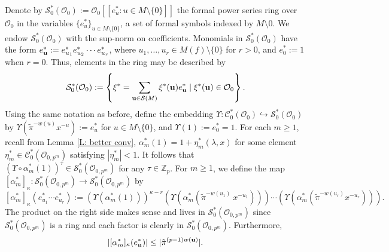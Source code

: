 \documentclass{article}
\theoremstyle{remark}
\def\bb #1{ {\mathbb #1} }
\def\c #1{ {\mathcal #1} }
\def\b #1{ {\bf #1} }
\begin{document}
\bigskip{} Denote by $\c S^*_0(\c O_0) := \c O_0[[ e_u^* : u \in M \setminus \{0\}]]$ the formal power series ring over $\c O_0$ in the variables $\{ e_u^* \}_{u \in M \setminus \{0\} }$, a set of formal symbols indexed by $M \setminus 0$. We endow $\c S_0^*( \c O_0)$ with the sup-norm on coefficients. Monomials in $\c S_0^*(\c O_0)$ have the form $e_{\b u}^* := e_{u_1}^* e_{u_2}^* \cdots e_{u_r}^*$, where $u_1, \ldots, u_r \in M(f) \setminus \{0\}$ for $r > 0$, and $e_0^* := 1$ when $r = 0$. Thus, elements in the ring may be described by
\[
\c S^*_0(\c O_0) := \left\{ \xi^* = \sum_{\b u \in \c S(M)} \xi^*(\b u) e_{\b u}^* \mid \xi^*(\b u) \in \c O_0  \right\}.
\]
Using the same notation as before, define the embedding $\Upsilon: \c C_0^*(\c O_0) \hookrightarrow \c S_0^*(\c O_0)$ by $\Upsilon(\tilde \pi^{-w(u)} x^{-u}) := e_u^*$ for $u \in M \setminus \{ 0\}$, and $\Upsilon(1) := e_0^* = 1$. For each $m \geq 1$, recall from Lemma \ref{L: better conv},  $\alpha_m^*(1)= 1 + \eta_m^*(\lambda, x)$ for some element $\eta_m^* \in \c C_0^*({\c O}_{0, p^m})$ satisfying $|\eta^*_m| < 1$. It follows that $\left(\Upsilon \circ \alpha_m^* (1) \right)^{\tau} \in \c S_0^*({\c O}_{0, p^m})$ for any $\tau \in \bb Z_p$. For $m \geq 1$,  we define the map $[\alpha_m^*]_\kappa: \c S_0^*(\c O_{0, p^m}) \rightarrow \c S_0^*({\c O}_{0, p^m})$ by 
\[
[\alpha_m^*]_\kappa( e_{u_1}^* \cdots e_{u_r}^* ) := (\Upsilon ( \alpha_m^*(1) ))^{\kappa - r} (\Upsilon ( \alpha_m^* (\tilde \pi^{-w(u_1)}\ x^{-u_1}) )) \cdots (\Upsilon ( \alpha_m^* (\tilde \pi^{-w(u_r)} x^{-u_r}))).
\]
The product on the right side makes sense and lives in $\c S_0^*(\c O_{0, p^m})$ since $\c S_0^*(\c O_{0, p^m})$ is a ring and each factor is clearly in $\c S_0^*(\c O_{0, p^m})$. Furthermore,
\begin{equation}\label{E: number14}
|[\alpha_m^*]_{\kappa}(e_{\b u}^*) | \leq |\tilde{\pi}^{(p-1)w(\b u)}|.
\end{equation}
\end{document}
